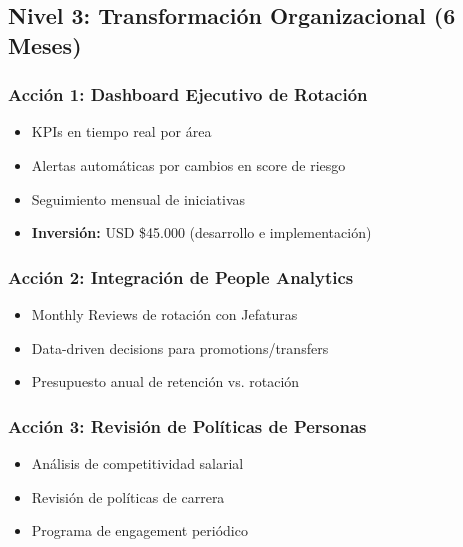 \documentclass[11pt,a4paper,twoside]{article}
\begin{document}
\subsection{Nivel 3: Transformación Organizacional (6 Meses)}

\subsubsection{Acción 1: Dashboard Ejecutivo de Rotación}

\begin{itemize}
    \item KPIs en tiempo real por área
    \item Alertas automáticas por cambios en score de riesgo
    \item Seguimiento mensual de iniciativas
    \item \textbf{Inversión:} USD \$45.000 (desarrollo e implementación)
\end{itemize}

\subsubsection{Acción 2: Integración de People Analytics}

\begin{itemize}
    \item Monthly Reviews de rotación con Jefaturas
    \item Data-driven decisions para promotions/transfers
    \item Presupuesto anual de retención vs. rotación
\end{itemize}

\subsubsection{Acción 3: Revisión de Políticas de Personas}

\begin{itemize}
    \item Análisis de competitividad salarial
    \item Revisión de políticas de carrera
    \item Programa de engagement periódico
\end{itemize}

\newpage

\end{document}
